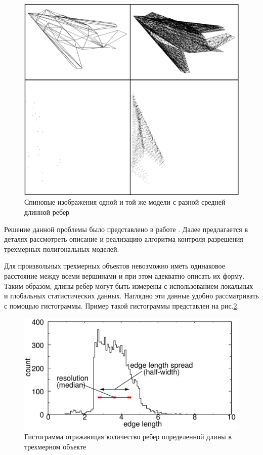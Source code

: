 \documentclass[14pt]{article}
\numberwithin{figure}{section}
\numberwithin{equation}{section}
\begin{document}
\begin{figure}[h]
	\begin{center}
		\includegraphics[scale=0.3]{5.JPG}
		\caption{Спиновые изображения одной и той же модели с разной средней длинной ребер}
		\label{ris:5}
	\end{center}
\end{figure}

Решение данной проблемы было представлено в работе \cite{Spin}. Далее предлагается в деталях рассмотреть описание и реализацию алгоритма контроля разрешения трехмерных полигональных моделей.

Для произвольных трехмерных объектов невозможно иметь одинаковое расстояние между всеми вершинами и при этом адекватно описать их форму. Таким образом, длины ребер могут быть измерены с использованием локальных и глобальных статистических данных. Наглядно эти данные удобно рассматривать с помощью гистограммы. Пример такой гистограммы представлен на рис.\ref{ris:mc1}.

\begin{figure}
	\begin{center}
		\includegraphics[scale = 0.6]{mc1.JPG}
		\caption{Гистограмма отражающая количество ребер определенной длины в трехмерном объекте}
		\label{ris:mc1}
	\end{center}
\end{figure}
\end{document}
